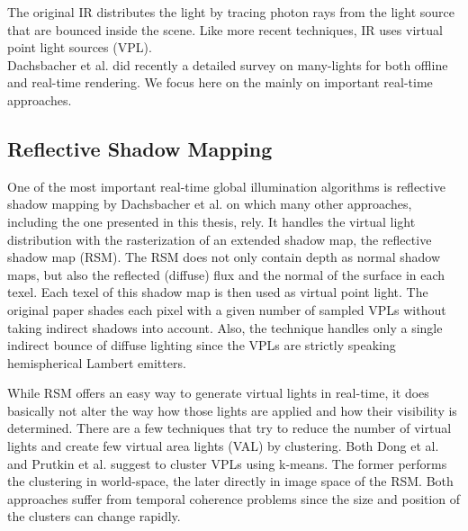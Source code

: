 \documentclass[thesis.tex]{subfiles}
\begin{document}
The original IR distributes the light by tracing photon rays from the light source that are bounced inside the scene.
Like more recent techniques, IR uses virtual point light sources (VPL).
\\
Dachsbacher et al. \cite{bib:manylightssurvey2014} did recently a detailed survey on many-lights for both offline and real-time rendering.
We focus here on the mainly on important real-time approaches.

\subsection{Reflective Shadow Mapping} \label{sec:prev:rsm}
One of the most important real-time global illumination algorithms is reflective shadow mapping by Dachsbacher et al. \cite{bib:reflectiveshadowmaps} on which many other approaches, including the one presented in this thesis, rely.
It handles the virtual light distribution with the rasterization of an extended shadow map, the reflective shadow map (RSM).
The RSM does not only contain depth as normal shadow maps, but also the reflected (diffuse) flux and the normal of the surface in each texel.
Each texel of this shadow map is then used as virtual point light.
The original paper shades each pixel with a given number of sampled VPLs without taking indirect shadows into account.
Also, the technique handles only a single indirect bounce of diffuse lighting since the VPLs are strictly speaking hemispherical Lambert emitters.

While RSM offers an easy way to generate virtual lights in real-time, it does basically not alter the way how those lights are applied and how their visibility is determined.
There are a few techniques that try to reduce the number of virtual lights and create few virtual area lights (VAL) by clustering.
Both Dong et al. \cite{bib:clusturedvisiblity:dong} and Prutkin et al. \cite{bib:clusturedvisiblity:prutkin} suggest to cluster VPLs using k-means.
The former performs the clustering in world-space, the later directly in image space of the RSM.
Both approaches suffer from temporal coherence problems since the size and position of the clusters can change rapidly.
\end{document}
